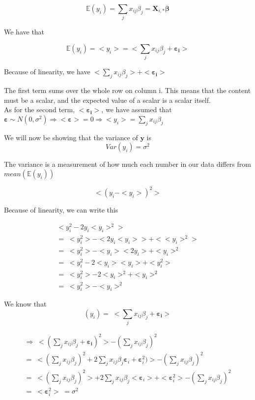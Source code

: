 \documentclass[reprint,english,notitlepage]{revtex4-1}  %
\begin{document}
    $$\mathbb{E}(y_i) = \sum_j x_{ij} \beta_j = \mathbf{X}_{i,*} \mathbf{\beta}$$

    We have that

    $$\mathbb{E}(y_i) = <y_i> = <\sum_j x_{ij} \beta_j + \boldsymbol{\varepsilon_i}>$$

    Because of linearity, we have $<\sum_j x_{ij} \beta_j> + <\boldsymbol{\varepsilon_i}>$

    The first term sums over the whole row on column i. This means that the content must be a scalar, and the expected value of a scalar is a scalar itself. \\

    As for the second term, $<\boldsymbol{\varepsilon_i}>$, we have assumed that $\boldsymbol{\varepsilon} \sim N(0, \sigma^2) \Rightarrow <\boldsymbol{\varepsilon}> = 0 \Rightarrow <y_i> = \sum_j x_{ij} \beta_j$



    We will now be showing that the variance of $\mathbf{y}$ is 
    $$Var(y_i) = \sigma^2$$
    
    The variance is a measurement of how much each number in our data differs from $mean(\mathbb{E}(y_i))$  

    $$<(y_i - <y_i>)^2>$$

    Because of linearity, we can write this
    
    \begin{gather*}    
     <y_i^2 - 2y_i <y_i>^2 > \\ = \;  <y_i^2> - <2y_i <y_i>> + <<y_i>^2> \\
    = \; <y_i^2> - <y_i><2y_i> + <y_i>^2 \\ 
    = \; <y_i^2 - 2<y_i><y_i> + <y_i^2> \\  =  \; <y_i^2> - 2<y_i>^2 + <y_i>^2 \\
    = \; <y_i^2> - <y_i>^2
    \end{gather*}

    We know that $$(y_i) =  \; <\sum_j x_{ij} \beta_j + \boldsymbol{\varepsilon_i}>$$

    \begin{gather*}
        \Rightarrow  \; <(\sum_j x_{ij} \beta_j + \boldsymbol{\varepsilon_i})^2> - (\sum_j x_{ij} \beta_j)^2 \\
        =  \; <(\sum_j x_{ij} \beta_j)^2 + 2  \sum_j x_{ij} \beta_j \boldsymbol{\varepsilon}_i + \boldsymbol{\varepsilon}_i^2)> - (\sum_j x_{ij} \beta_j)^2 \\
        =  \; <(\sum_j x_{ij} \beta_j)^2> + 2  \sum_j x_{ij} \beta_j <\boldsymbol{\varepsilon}_i> + <\boldsymbol{\varepsilon}_i^2> - (\sum_j x_{ij} \beta_j)^2 \\
        =  \; <\boldsymbol{\varepsilon}_i^2>  \; =   \sigma^2
    \end{gather*}
\end{document}
